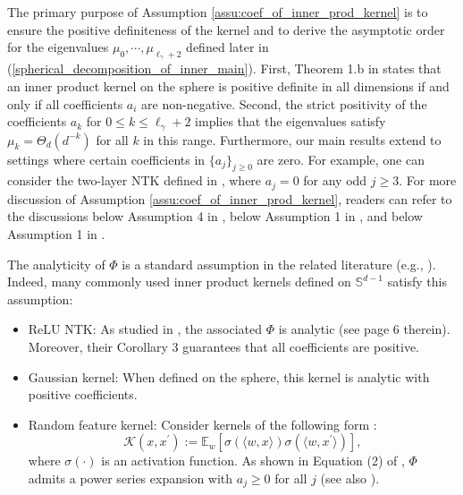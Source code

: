 \documentclass{article}
\theoremstyle{plain}
\theoremstyle{definition}
\theoremstyle{remark}
\begin{document}



The primary purpose of Assumption \ref{assu:coef_of_inner_prod_kernel} is to ensure the positive definiteness of the kernel and to derive the asymptotic order for the 
eigenvalues $\mu_0, \cdots, \mu_{\ell_{\gamma} + 2}$ defined later in (\ref{spherical_decomposition_of_inner_main}). 
First, Theorem 1.b in \cite{gneiting2013strictly} states that an inner product kernel on the sphere is positive definite in all dimensions if and only if all coefficients $a_{i}$ are non-negative. 
Second, the strict positivity of the coefficients $a_k$ for $0 \leq k \leq \ell_{\gamma} + 2$ implies that the eigenvalues  satisfy $\mu_k = \Theta_d( d^{-k} )$ for all $k$ in this range.
%
%
Furthermore, our main results extend to settings where certain coefficients in $\{a_{j}\}_{j \geq 0}$ are zero. 
For example, one can consider the two-layer NTK defined in \cite{Bietti_on_2019}, where $a_j=0$ for any odd $j\geq 3$.
For more discussion of Assumption \ref{assu:coef_of_inner_prod_kernel}, readers can refer to the discussions below Assumption 4 in \cite{lu2023optimal}, below 
Assumption 1 in \cite{lu2024saturation}, and below Assumption 1 in \cite{zhang2024phase}.


The analyticity of $\Phi$ is a standard assumption in the related literature (e.g., \cite{liang2020multiple, xiao2022precise, hu2022sharp, lu2023optimal, zhang2024optimal, lu2024saturation, zhang2024phase, lu2024pinsker}). Indeed, many commonly used inner product kernels defined on $\mathbb{S}^{d-1}$ satisfy this assumption:
\begin{itemize}
    \item ReLU NTK: As studied in \cite{Bietti_deep_2021}, the associated $\Phi$ is analytic (see page 6 therein). Moreover, their Corollary 3 guarantees that all coefficients are positive.

    \item Gaussian kernel: When defined on the sphere, this kernel is analytic with positive coefficients.
    
    \item Random feature kernel: Consider kernels of the following form \citep{ghorbani2021linearized, mei2022generalization}:
    $$
    \mathscr{K}(x, x^{\prime}) := \mathbb{E}_{w}[\sigma(\langle w, x\rangle)\sigma(\langle w, x^{\prime}\rangle)],
    $$
    where $\sigma(\cdot)$ is an activation function. As shown in Equation (2) of \cite{Bietti_deep_2021}, $\Phi$ admits a power series expansion with $a_j \geq 0$ for all $j$  (see also \cite{daniely2016toward}).
    
\end{itemize}
\end{document}
